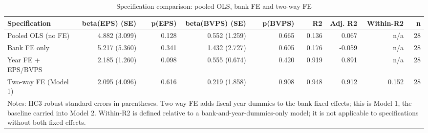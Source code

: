 \begin{table}[htbp]
\centering
\caption{Specification comparison: pooled OLS, bank FE and two-way FE}
\label{tab:a5_specification_comparison}
\begin{tabular}{lrrrrrrrr}
\toprule
Specification & beta(EPS) (SE) & p(EPS) & beta(BVPS) (SE) & p(BVPS) & R2 & Adj. R2 & Within-R2 & n \\
\midrule
Pooled OLS (no FE) & 4.882 (3.099) & 0.128 & 0.552 (1.259) & 0.665 & 0.136 & 0.067 & n/a & 28 \\
Bank FE only & 5.217 (5.360) & 0.341 & 1.432 (2.727) & 0.605 & 0.176 & -0.059 & n/a & 28 \\
Year FE + EPS/BVPS & 2.185 (1.260) & 0.098 & 0.555 (0.674) & 0.420 & 0.919 & 0.891 & n/a & 28 \\
Two-way FE (Model 1) & 2.095 (4.096) & 0.616 & 0.219 (1.858) & 0.908 & 0.948 & 0.912 & 0.152 & 28 \\
\midrule
\multicolumn{9}{l}{\footnotesize Notes: HC3 robust standard errors in parentheses. Two-way FE adds fiscal-year dummies to the bank fixed effects; this is Model 1, the baseline carried into Model 2. Within-R2 is defined relative to a bank-and-year-dummies-only model; it is not applicable to specifications without both fixed effects.} \\
\bottomrule
\end{tabular}
\end{table}
